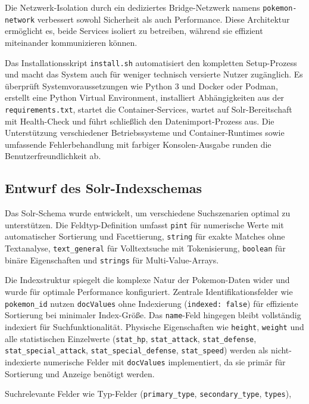 Die Netzwerk-Isolation durch ein dediziertes Bridge-Netzwerk namens \texttt{pokemon-network} verbessert sowohl Sicherheit als auch Performance. Diese Architektur ermöglicht es, beide Services isoliert zu betreiben, während sie effizient miteinander kommunizieren können.

Das Installationsskript \texttt{install.sh} automatisiert den kompletten Setup-Prozess und macht das System auch für weniger technisch versierte Nutzer zugänglich. Es überprüft Systemvoraussetzungen wie Python 3 und Docker oder Podman, erstellt eine Python Virtual Environment, installiert Abhängigkeiten aus der \texttt{requirements.txt}, startet die Container-Services, wartet auf Solr-Bereitschaft mit Health-Check und führt schließlich den Datenimport-Prozess aus. Die Unterstützung verschiedener Betriebssysteme und Container-Runtimes sowie umfassende Fehlerbehandlung mit farbiger Konsolen-Ausgabe runden die Benutzerfreundlichkeit ab.

\subsection{Entwurf des Solr-Indexschemas}

Das Solr-Schema wurde entwickelt, um verschiedene Suchszenarien optimal zu unterstützen. Die Feldtyp-Definition umfasst \texttt{pint} für numerische Werte mit automatischer Sortierung und Facettierung, \texttt{string} für exakte Matches ohne Textanalyse, \texttt{text\_general} für Volltextsuche mit Tokenisierung, \texttt{boolean} für binäre Eigenschaften und \texttt{strings} für Multi-Value-Arrays.

Die Indexstruktur spiegelt die komplexe Natur der Pokemon-Daten wider und wurde für optimale Performance konfiguriert. Zentrale Identifikationsfelder wie \texttt{pokemon\_id} nutzen \texttt{docValues} ohne Indexierung (\texttt{indexed: false}) für effiziente Sortierung bei minimaler Index-Größe. Das \texttt{name}-Feld hingegen bleibt vollständig indexiert für Suchfunktionalität. Physische Eigenschaften wie \texttt{height}, \texttt{weight} und alle statistischen Einzelwerte (\texttt{stat\_hp}, \texttt{stat\_attack}, \texttt{stat\_defense}, \texttt{stat\_special\_attack}, \texttt{stat\_special\_defense}, \texttt{stat\_speed}) werden als nicht-indexierte numerische Felder mit \texttt{docValues} implementiert, da sie primär für Sortierung und Anzeige benötigt werden.

Suchrelevante Felder wie Typ-Felder (\texttt{primary\_type}, \texttt{secondary\_type}, \texttt{types}), 

